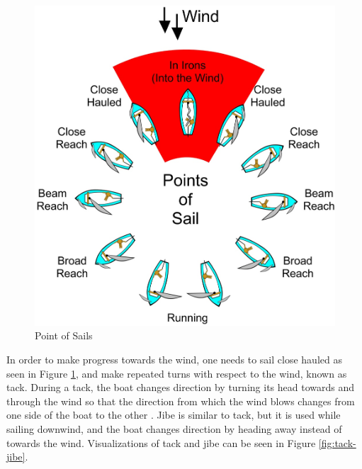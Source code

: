 \documentclass[12pt,twoside]{report}
\begin{document}
\begin{figure}[h]
\centering
\includegraphics[width = 0.55\hsize]{figures/sailing/PointsOfSail.png}
\caption{Point of Sails \cite{img:sailing-tack-gybe}}
\label{fig:points-of-sail}
\end{figure}

In order to make progress towards the wind, one needs to sail close hauled as seen in Figure \ref{fig:points-of-sail}, and make repeated turns with respect to the wind, known as tack. During a tack, the boat changes direction by turning its head towards and through the wind so that the direction from which the wind blows changes from one side of the boat to the other \cite{wiki:tack}. Jibe is similar to tack, but it is used while sailing downwind, and the boat changes direction by heading away instead of towards the wind. Visualizations of tack and jibe can be seen in Figure \ref{fig:tack-jibe}. 
\end{document}
